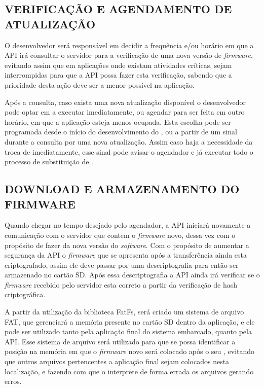 
\subsection{VERIFICAÇÃO E AGENDAMENTO DE ATUALIZAÇÃO}

O desenvolvedor será responsável em decidir a frequência e/ou horário em que a API irá consultar o servidor para a verificação de uma nova versão de \textit{firmware}, evitando assim que em aplicações onde existam atividades críticas, sejam interrompidas para que a API possa fazer esta verificação, sabendo que a prioridade desta ação deve ser a menor possível na aplicação.

Após a consulta, caso exista uma nova atualização disponível o desenvolvedor pode optar em a executar imediatamente, ou agendar para ser feita em outro horário, em que a aplicação esteja menos ocupada. Esta escolha pode ser programada desde o início do desenvolvimento do \firmware, ou a partir de um sinal durante a consulta por uma nova atualização. Assim caso haja a necessidade da troca de \software imediatamente, esse sinal pode avisar o agendador e já executar todo o processo de substituição de \firmware. 

\subsection{DOWNLOAD E ARMAZENAMENTO DO FIRMWARE}

Quando chegar no tempo desejado pelo agendador, a API iniciará novamente a comunicação com o servidor que contem o \textit{firmware} novo, dessa vez com o propósito de fazer \download da nova versão do \textit{software}. Com o propósito de aumentar a segurança da API o \textit{firmware} que se apresenta após a transferência ainda esta criptografado, assim ele deve passar por uma descriptografia para então ser armazenado no cartão SD. Após essa descriptografia a API ainda irá verificar se o \textit{firmware} recebido pelo servidor esta correto a partir da verificação de hash criptográfica. 

A partir da utilização da biblioteca FatFs, será criado um sistema de arquivo FAT, que gerenciará a memória presente no cartão SD dentro da aplicação, e ele pode ser utilizado tanto pela aplicação final do sistema embarcado, quanto pela API. Esse sistema de arquivo será utilizado para que se possa identificar a posição na memória em que o \textit{firmware} novo será colocado após o seu \download, evitando que outros arquivos pertencentes a aplicação final sejam colocados nesta localização, e fazendo com que o \bootloader interprete de forma errada os arquivos gerando erros.

